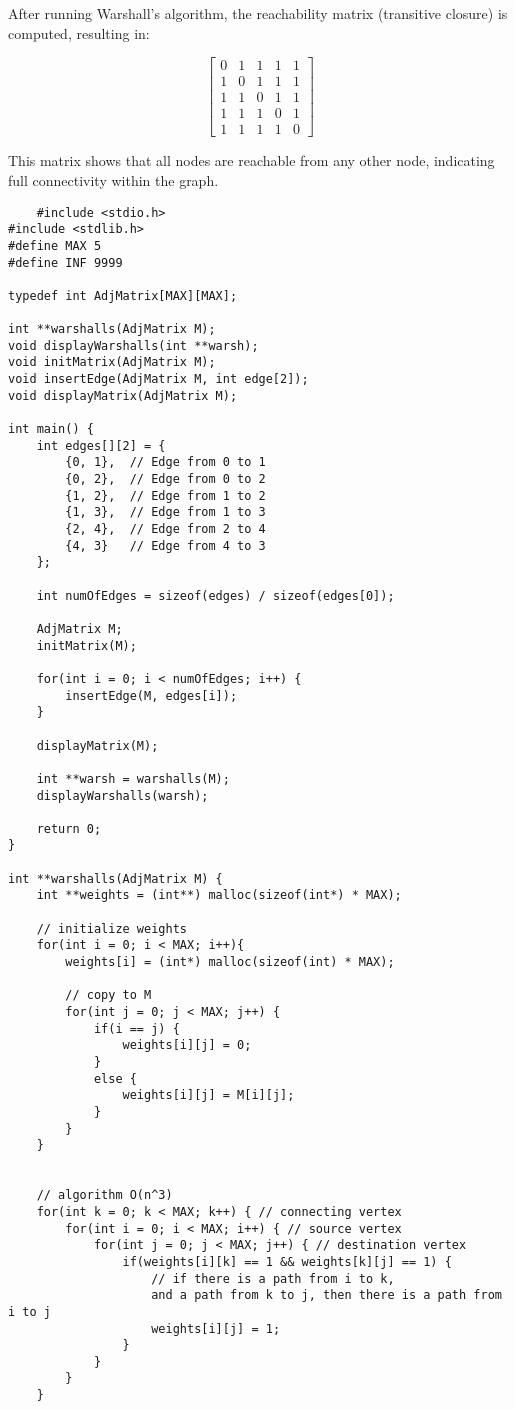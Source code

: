 \documentclass{book}
\begin{document}
After running Warshall's algorithm, the reachability matrix (transitive closure) is computed, resulting in:

\[
\begin{bmatrix}
0 & 1 & 1 & 1 & 1 \\
1 & 0 & 1 & 1 & 1 \\
1 & 1 & 0 & 1 & 1 \\
1 & 1 & 1 & 0 & 1 \\
1 & 1 & 1 & 1 & 0
\end{bmatrix}
\]

This matrix shows that all nodes are reachable from any other node, indicating full connectivity within the graph.

\onecolumn
\begin{verbatim}
    #include <stdio.h>
#include <stdlib.h>
#define MAX 5
#define INF 9999

typedef int AdjMatrix[MAX][MAX];

int **warshalls(AdjMatrix M);
void displayWarshalls(int **warsh);
void initMatrix(AdjMatrix M);
void insertEdge(AdjMatrix M, int edge[2]);
void displayMatrix(AdjMatrix M);

int main() {
    int edges[][2] = {
        {0, 1},  // Edge from 0 to 1 
        {0, 2},  // Edge from 0 to 2 
        {1, 2},  // Edge from 1 to 2 
        {1, 3},  // Edge from 1 to 3
        {2, 4},  // Edge from 2 to 4
        {4, 3}   // Edge from 4 to 3
    };

    int numOfEdges = sizeof(edges) / sizeof(edges[0]);
    
    AdjMatrix M;
    initMatrix(M);

    for(int i = 0; i < numOfEdges; i++) {
        insertEdge(M, edges[i]);
    }

    displayMatrix(M);

    int **warsh = warshalls(M);
    displayWarshalls(warsh);

    return 0;
}

int **warshalls(AdjMatrix M) {
    int **weights = (int**) malloc(sizeof(int*) * MAX);

    // initialize weights
    for(int i = 0; i < MAX; i++){
        weights[i] = (int*) malloc(sizeof(int) * MAX);

        // copy to M
        for(int j = 0; j < MAX; j++) {
            if(i == j) {
                weights[i][j] = 0;
            }
            else {
                weights[i][j] = M[i][j];
            }
        }
    }


    // algorithm O(n^3)
    for(int k = 0; k < MAX; k++) { // connecting vertex
        for(int i = 0; i < MAX; i++) { // source vertex
            for(int j = 0; j < MAX; j++) { // destination vertex
                if(weights[i][k] == 1 && weights[k][j] == 1) { 
                    // if there is a path from i to k, 
                    and a path from k to j, then there is a path from i to j
                    weights[i][j] = 1;
                } 
            }
        }
    }


\end{verbatim}
\end{document}
